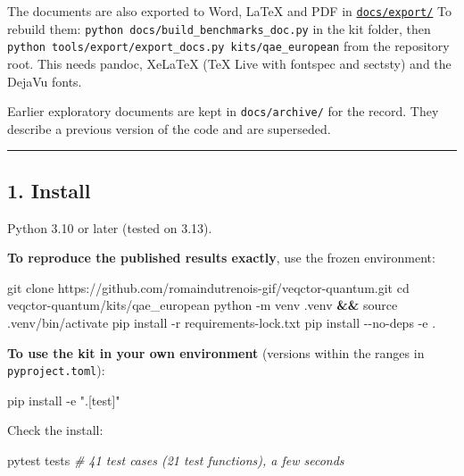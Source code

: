 \documentclass[
  10pt,
]{article}
\newenvironment{Shaded}{}{}
\newcommand{\AttributeTok}[1]{\textcolor[rgb]{0.49,0.56,0.16}{#1}}
\newcommand{\BuiltInTok}[1]{\textcolor[rgb]{0.00,0.50,0.00}{#1}}
\newcommand{\CommentTok}[1]{\textcolor[rgb]{0.38,0.63,0.69}{\textit{#1}}}
\newcommand{\ExtensionTok}[1]{#1}
\newcommand{\FunctionTok}[1]{\textcolor[rgb]{0.02,0.16,0.49}{#1}}
\newcommand{\KeywordTok}[1]{\textcolor[rgb]{0.00,0.44,0.13}{\textbf{#1}}}
\newcommand{\NormalTok}[1]{#1}
\newcommand{\StringTok}[1]{\textcolor[rgb]{0.25,0.44,0.63}{#1}}
\begin{document}
The documents are also exported to Word, LaTeX and PDF in
\href{docs/export/}{\texttt{docs/export/}} To rebuild them:
\texttt{python\ docs/build\_benchmarks\_doc.py} in the kit folder, then
\texttt{python\ tools/export/export\_docs.py\ kits/qae\_european} from
the repository root. This needs pandoc, XeLaTeX (TeX Live with fontspec
and sectsty) and the DejaVu fonts.

Earlier exploratory documents are kept in \texttt{docs/archive/} for the
record. They describe a previous version of the code and are superseded.

\begin{center}\rule{0.5\linewidth}{0.5pt}\end{center}

\hypertarget{1-install}{%
\subsection{1. Install}\label{1-install}}

Python 3.10 or later (tested on 3.13).

\textbf{To reproduce the published results exactly}, use the frozen
environment:

\begin{Shaded}
\begin{Highlighting}[]
\FunctionTok{git}\NormalTok{ clone https://github.com/romaindutrenois{-}gif/veqctor{-}quantum.git}
\BuiltInTok{cd}\NormalTok{ veqctor{-}quantum/kits/qae\_european}
\ExtensionTok{python} \AttributeTok{{-}m}\NormalTok{ venv .venv }\KeywordTok{\&\&} \BuiltInTok{source}\NormalTok{ .venv/bin/activate}
\ExtensionTok{pip}\NormalTok{ install }\AttributeTok{{-}r}\NormalTok{ requirements{-}lock.txt}
\ExtensionTok{pip}\NormalTok{ install }\AttributeTok{{-}{-}no{-}deps} \AttributeTok{{-}e}\NormalTok{ .}
\end{Highlighting}
\end{Shaded}

\textbf{To use the kit in your own environment} (versions within the
ranges in \texttt{pyproject.toml}):

\begin{Shaded}
\begin{Highlighting}[]
\ExtensionTok{pip}\NormalTok{ install }\AttributeTok{{-}e} \StringTok{".[test]"}
\end{Highlighting}
\end{Shaded}

Check the install:

\begin{Shaded}
\begin{Highlighting}[]
\ExtensionTok{pytest}\NormalTok{ tests          }\CommentTok{\# 41 test cases (21 test functions), a few seconds}
\end{Highlighting}
\end{Shaded}
\end{document}
